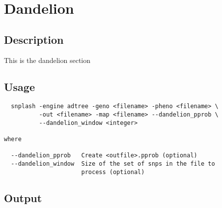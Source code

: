 \section{Dandelion}
\label{sec:dandy}
\subsection{Description}
This is the dandelion section
\subsection{Usage}
\begin{verbatim}
  snplash -engine adtree -geno <filename> -pheno <filename> \
          -out <filename> -map <filename> --dandelion_pprob \
          --dandelion_window <integer>

where

  --dandelion_pprob   Create <outfile>.pprob (optional)
  --dandelion_window  Size of the set of snps in the file to
                      process (optional)
\end{verbatim}

\subsection{Output}

